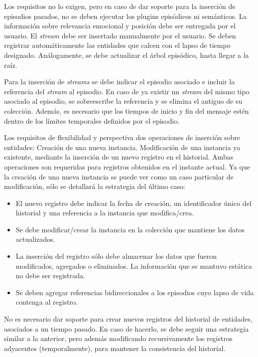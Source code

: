 Los requisitos no lo exigen, pero en caso de dar soporte para la inserción de episodios pasados, no se deben ejecutar los plugins episódicos ni semánticos. La información sobre relevancia emocional y posición debe ser entregada por el usuario. El \textit{stream} debe ser insertado manualmente por el usuario. Se deben registrar automáticamente las entidades que calcen con el lapso de tiempo designado. Análogamente, se debe actualizar el árbol episódico, hasta llegar a la raíz.

Para la inserción de \textit{streams} se debe indicar el episodio asociado e incluir la referencia del \textit{stream} al episodio. En caso de ya existir un \textit{stream} del mismo tipo asociado al episodio, se sobreescribe la referencia y se elimina el antiguo de su colección. Además, es necesario que los tiempos de inicio y fin del mensaje estén dentro de los límites temporales definidos por el episodio.

Los requisitos de flexibilidad  y perspectiva  dos operaciones de inserción sobre entidades: Creación de una nueva instancia. Modificación de una instancia ya existente, mediante la inserción de un nuevo registro en el historial. Ambas operaciones son requeridas para registros obtenidos en el instante actual. Ya que la creación de una nueva instancia se puede ver como un caso particular de modificación, sólo se detallará la estrategia del último caso:
\begin{itemize}
\item El nuevo registro debe indicar la fecha de creación, un identificador único del historial y una referencia a la instancia que modifica/crea.
\item Se debe modificar/crear la instancia en la colección que mantiene los datos actualizados.
\item La inserción del registro sólo debe almacenar los datos que fueron modificados, agregados o eliminados. La información que se mantuvo estática no debe ser registrada.
\item Se deben agregar referencias bidireccionales a los episodios cuyo lapso de vida contenga al registro.
\end{itemize}

No es necesario dar soporte para crear nuevos registros del historial de entidades, asociados a un tiempo pasado. En caso de hacerlo, se debe seguir una estrategia similar a la anterior, pero además modificando recursivamente los registros adyacentes (temporalmente), para mantener la consistencia del historial.

